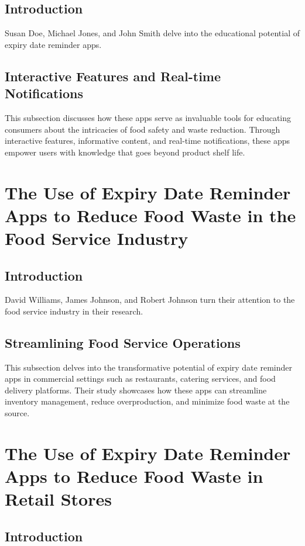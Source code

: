 \subsection{Introduction}

Susan Doe, Michael Jones, and John Smith delve into the educational potential of expiry date reminder apps.

\subsection{Interactive Features and Real-time Notifications}

This subsection discusses how these apps serve as invaluable tools for educating consumers about the intricacies of food safety and waste reduction. Through interactive features, informative content, and real-time notifications, these apps empower users with knowledge that goes beyond product shelf life.

\section{The Use of Expiry Date Reminder Apps to Reduce Food Waste in the Food Service Industry}

\subsection{Introduction}

David Williams, James Johnson, and Robert Johnson turn their attention to the food service industry in their research.

\subsection{Streamlining Food Service Operations}

This subsection delves into the transformative potential of expiry date reminder apps in commercial settings such as restaurants, catering services, and food delivery platforms. Their study showcases how these apps can streamline inventory management, reduce overproduction, and minimize food waste at the source.

\section{The Use of Expiry Date Reminder Apps to Reduce Food Waste in Retail Stores}

\subsection{Introduction}


